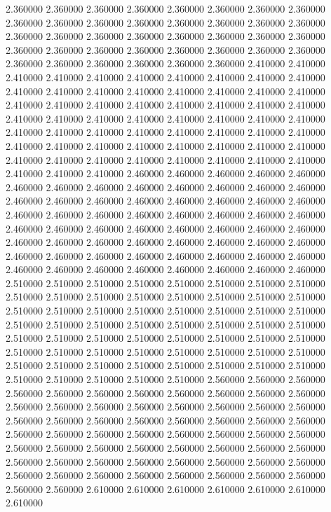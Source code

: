 2.360000
2.360000
2.360000
2.360000
2.360000
2.360000
2.360000
2.360000
2.360000
2.360000
2.360000
2.360000
2.360000
2.360000
2.360000
2.360000
2.360000
2.360000
2.360000
2.360000
2.360000
2.360000
2.360000
2.360000
2.360000
2.360000
2.360000
2.360000
2.360000
2.360000
2.360000
2.360000
2.360000
2.360000
2.360000
2.360000
2.360000
2.360000
2.410000
2.410000
2.410000
2.410000
2.410000
2.410000
2.410000
2.410000
2.410000
2.410000
2.410000
2.410000
2.410000
2.410000
2.410000
2.410000
2.410000
2.410000
2.410000
2.410000
2.410000
2.410000
2.410000
2.410000
2.410000
2.410000
2.410000
2.410000
2.410000
2.410000
2.410000
2.410000
2.410000
2.410000
2.410000
2.410000
2.410000
2.410000
2.410000
2.410000
2.410000
2.410000
2.410000
2.410000
2.410000
2.410000
2.410000
2.410000
2.410000
2.410000
2.410000
2.410000
2.410000
2.410000
2.410000
2.410000
2.410000
2.410000
2.410000
2.410000
2.410000
2.460000
2.460000
2.460000
2.460000
2.460000
2.460000
2.460000
2.460000
2.460000
2.460000
2.460000
2.460000
2.460000
2.460000
2.460000
2.460000
2.460000
2.460000
2.460000
2.460000
2.460000
2.460000
2.460000
2.460000
2.460000
2.460000
2.460000
2.460000
2.460000
2.460000
2.460000
2.460000
2.460000
2.460000
2.460000
2.460000
2.460000
2.460000
2.460000
2.460000
2.460000
2.460000
2.460000
2.460000
2.460000
2.460000
2.460000
2.460000
2.460000
2.460000
2.460000
2.460000
2.460000
2.460000
2.460000
2.460000
2.460000
2.460000
2.460000
2.460000
2.460000
2.510000
2.510000
2.510000
2.510000
2.510000
2.510000
2.510000
2.510000
2.510000
2.510000
2.510000
2.510000
2.510000
2.510000
2.510000
2.510000
2.510000
2.510000
2.510000
2.510000
2.510000
2.510000
2.510000
2.510000
2.510000
2.510000
2.510000
2.510000
2.510000
2.510000
2.510000
2.510000
2.510000
2.510000
2.510000
2.510000
2.510000
2.510000
2.510000
2.510000
2.510000
2.510000
2.510000
2.510000
2.510000
2.510000
2.510000
2.510000
2.510000
2.510000
2.510000
2.510000
2.510000
2.510000
2.510000
2.510000
2.510000
2.510000
2.510000
2.510000
2.510000
2.560000
2.560000
2.560000
2.560000
2.560000
2.560000
2.560000
2.560000
2.560000
2.560000
2.560000
2.560000
2.560000
2.560000
2.560000
2.560000
2.560000
2.560000
2.560000
2.560000
2.560000
2.560000
2.560000
2.560000
2.560000
2.560000
2.560000
2.560000
2.560000
2.560000
2.560000
2.560000
2.560000
2.560000
2.560000
2.560000
2.560000
2.560000
2.560000
2.560000
2.560000
2.560000
2.560000
2.560000
2.560000
2.560000
2.560000
2.560000
2.560000
2.560000
2.560000
2.560000
2.560000
2.560000
2.560000
2.560000
2.560000
2.560000
2.560000
2.560000
2.560000
2.610000
2.610000
2.610000
2.610000
2.610000
2.610000
2.610000
